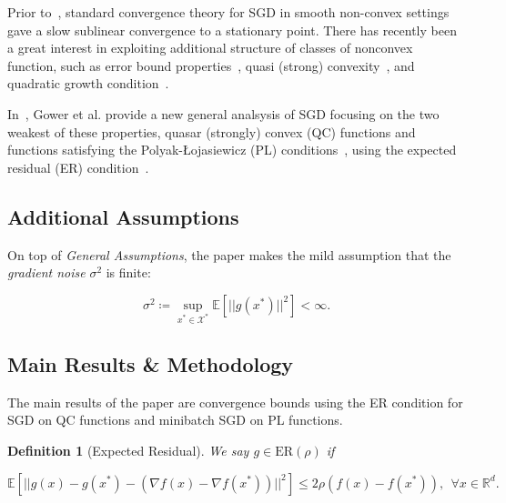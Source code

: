 \documentclass{article}
\newtheorem{definition}{Definition}[section]
\begin{document}
Prior to~\cite{https://doi.org/10.48550/arxiv.2006.10311}, standard convergence theory for SGD in smooth non-convex settings gave a slow sublinear convergence to a stationary point. There has recently been a great interest
in exploiting additional structure of classes of nonconvex function, such as error bound properties~\cite{Fabian2010ErrorBN},
quasi (strong) convexity~\cite{https://doi.org/10.48550/arxiv.1906.11985, JMLR:v19:16-465, https://doi.org/10.48550/arxiv.1710.00797}, and quadratic growth condition~\cite{doi:10.1137/S1052623499359178}.

In~\cite{https://doi.org/10.48550/arxiv.2006.10311}, Gower et al. provide a new general analsysis of SGD focusing on the two weakest of these properties, quasar (strongly) convex (QC) functions and functions satisfying the
Polyak-Łojasiewicz (PL) conditions~\cite{POLYAK1963864}, using the expected residual (ER) condition~\cite{Gower2021StochasticQM}.

\subsection{Additional Assumptions}

On top of \textit{General Assumptions}, the paper makes the mild assumption that the \textit{gradient noise} $\sigma^2$ is finite:

\begin{equation}
	\sigma^2 \coloneqq \sup_{x^*\in\mathcal{X^*}} \mathbb{E}\left[||g(x^*)||^2\right] < \infty.
\end{equation}

\subsection{Main Results \& Methodology}

The main results of the paper are convergence bounds using the ER condition for SGD on QC functions and minibatch SGD on PL functions.

\begin{definition}[Expected Residual]
	We say $g\in\text{ER}(\rho)$ if

	\[
		\mathbb{E}\left[||g(x) - g(x^*) - (\nabla f(x) - \nabla f(x^*))||^2\right] \leq 2\rho (f(x) - f(x^*)), \ \ \forall x\in\mathbb{R}^d.
	\]
\end{definition}
\end{document}
